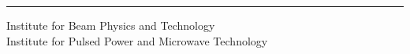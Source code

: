 \begin{titlepage}
\begin{center}
	\enlargethispage{2cm}
	\vspace*{-1.5cm}
	\hspace{0.8em}
	\rule[-8.0mm]{1pt}{18.3mm}
	\hspace{0.8em}
	\parbox{55.5ex}
	{
		\sffamily
		\large Institute for Beam Physics and Technology\\
		\large Institute for Pulsed Power and Microwave Technology
	}
\end{center}


\end{titlepage}
